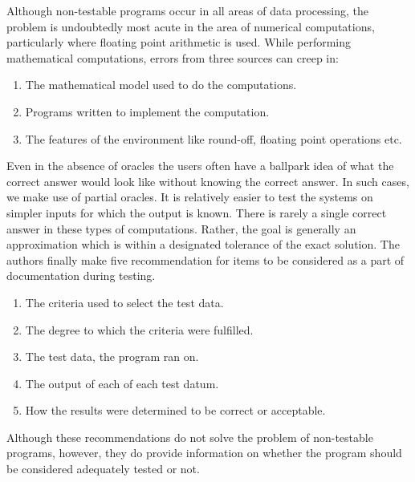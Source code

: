 Although non-testable programs occur in all areas of data processing, the problem is undoubtedly most acute in the area of numerical computations, particularly where floating point arithmetic is used. While performing mathematical computations, errors from three sources can creep in:
\begin{enumerate}
  \item The mathematical model used to do the computations.
  \item Programs written to implement the computation.
  \item The features of the environment like round-off, floating point operations etc.
\end{enumerate}
Even in the absence of oracles the users often have a ballpark idea of what the correct answer would look like without knowing the correct answer. In such cases, we make use of partial oracles. It is relatively easier to test the systems on simpler inputs for which the output is known. There is rarely a single correct answer in these types of computations. Rather, the goal is generally an approximation which is within a designated tolerance of the exact solution. The authors finally make five recommendation for items to be considered as a part of documentation during testing.
\begin{enumerate}
  \item The criteria used to select the test data.
  \item The degree to which the criteria were fulfilled.
  \item The test data, the program ran on.
  \item The output of each of each test datum.
  \item How the results were determined to be correct or acceptable.
\end{enumerate}
Although these recommendations do not solve the problem of non-testable programs, however, they do provide information on whether the program should be considered adequately tested or not.
